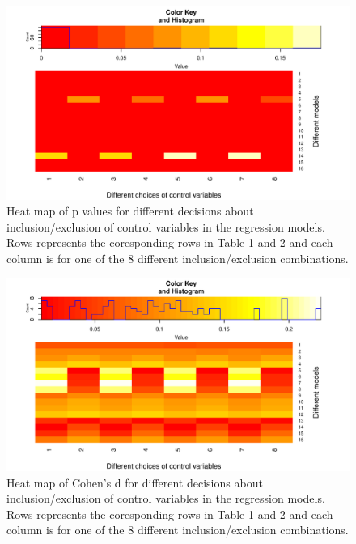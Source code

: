 \documentclass[man]{apa6}
\theoremstyle{definition}
\theoremstyle{definition}
\theoremstyle{definition}
\theoremstyle{remark}
\begin{document}
\begin{figure}
\centering
\includegraphics{stats_6_final_files/figure-latex/heat-p-model-1.pdf}
\caption{\label{fig:heat-p-model}Heat map of p values for different
decisions about inclusion/exclusion of control variables in the
regression models. Rows represents the coresponding rows in Table 1 and
2 and each column is for one of the 8 different inclusion/exclusion
combinations.}
\end{figure}

\begin{figure}
\centering
\includegraphics{stats_6_final_files/figure-latex/heat-d-model-1.pdf}
\caption{\label{fig:heat-d-model}Heat map of Cohen's d for different
decisions about inclusion/exclusion of control variables in the
regression models. Rows represents the coresponding rows in Table 1 and
2 and each column is for one of the 8 different inclusion/exclusion
combinations.}
\end{figure}
\end{document}

